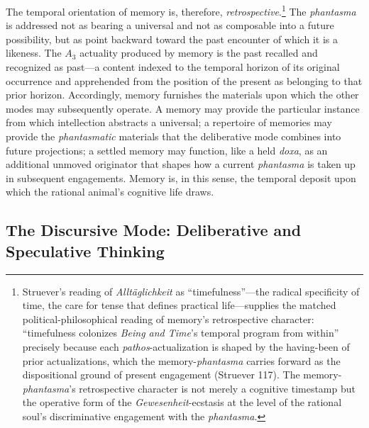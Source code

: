 The temporal orientation of memory is, therefore, \textit{retrospective}.\footnote{Struever's reading of \textit{Alltäglichkeit} as ``timefulness''---the radical specificity of time, the care for tense that defines practical life---supplies the matched political-philosophical reading of memory's retrospective character: ``timefulness colonizes \textit{Being and Time}'s temporal program from within'' precisely because each \textit{pathos}-actualization is shaped by the having-been of prior actualizations, which the memory-\textit{phantasma} carries forward as the dispositional ground of present engagement (Struever 117). The memory-\textit{phantasma}'s retrospective character is not merely a cognitive timestamp but the operative form of the \textit{Gewesenheit}-ecstasis at the level of the rational soul's discriminative engagement with the \textit{phantasma}.} The \textit{phantasma} is addressed not as bearing a universal and not as composable into a future possibility, but as point backward toward the past encounter of which it is a likeness. The $A_3$ actuality produced by memory is the past recalled and recognized as past---a content indexed to the temporal horizon of its original occurrence and apprehended from the position of the present as belonging to that prior horizon. Accordingly, memory furnishes the materials upon which the other modes may subsequently operate. A memory may provide the particular instance from which intellection abstracts a universal; a repertoire of memories may provide the \textit{phantasmatic} materials that the deliberative mode combines into future projections; a settled memory may function, like a held \textit{doxa}, as an additional unmoved originator that shapes how a current \textit{phantasma} is taken up in subsequent engagements. Memory is, in this sense, the temporal deposit upon which the rational animal's cognitive life draws. 

\subsection{The Discursive Mode: Deliberative and Speculative Thinking}


